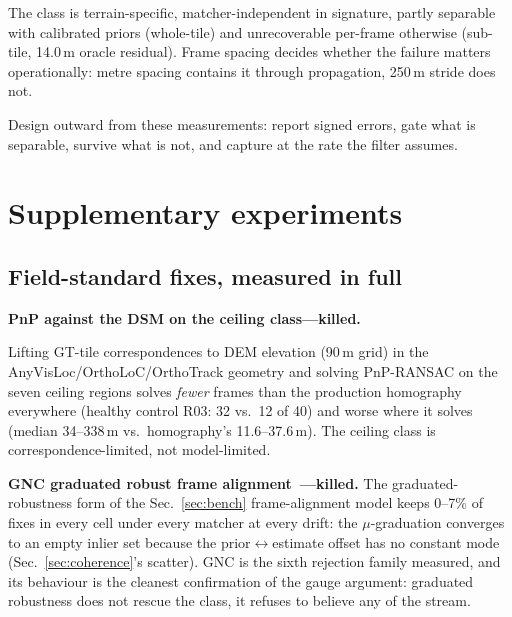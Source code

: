 \documentclass[journal]{IEEEtran}
\begin{document}
The class is terrain-specific, matcher-independent in signature, partly separable with calibrated priors (whole-tile) and unrecoverable per-frame otherwise (sub-tile, 14.0\,m oracle residual). Frame spacing decides whether the failure matters operationally: metre spacing contains it through propagation, 250\,m stride does not.

Design outward from these measurements: report signed errors, gate what is separable, survive what is not, and capture at the rate the filter assumes.

\appendix
\section{Supplementary experiments}

\subsection{Field-standard fixes, measured in full}
\label{sec:app-fixes}
\label{sec:fixes}

\textbf{PnP against the DSM on the ceiling class---killed.} {\sloppy
Lifting GT-tile correspondences to DEM elevation (90\,m grid) in the AnyVisLoc/OrthoLoC/OrthoTrack geometry and solving PnP-RANSAC on the seven ceiling regions solves \emph{fewer} frames than the production homography everywhere (healthy control R03: 32 vs.\ 12 of 40) and worse where it solves (median 34--338\,m vs.\ homography's 11.6--37.6\,m). The ceiling class is correspondence-limited, not model-limited.\par}

\textbf{GNC graduated robust frame alignment~\cite{yang2020}---killed.} The graduated-robustness form of the Sec.~\ref{sec:bench} frame-alignment model keeps 0--7\% of fixes in every cell under every matcher at every drift: the $\mu$-graduation converges to an empty inlier set because the prior$\leftrightarrow$estimate offset has no constant mode (Sec.~\ref{sec:coherence}'s scatter). GNC is the sixth rejection family measured, and its behaviour is the cleanest confirmation of the gauge argument: graduated robustness does not rescue the class, it refuses to believe any of the stream.
\end{document}
